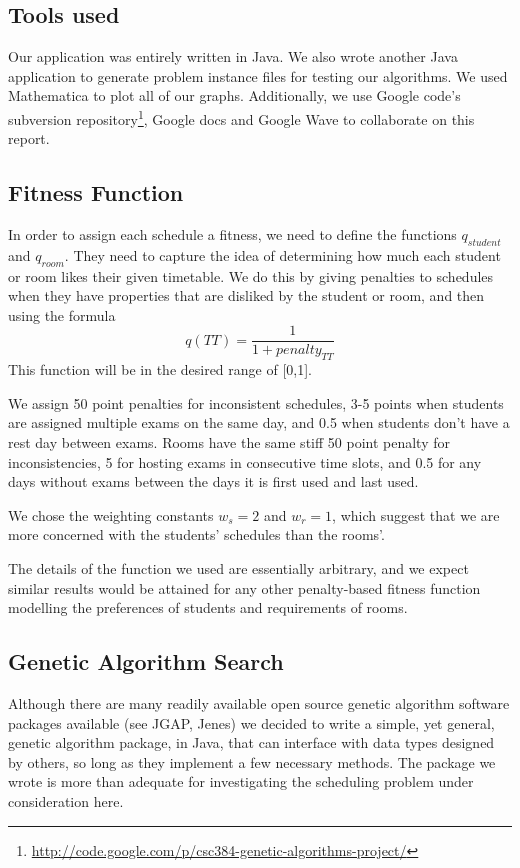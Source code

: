\documentclass[letterpaper]{article}
\begin{document}
  \subsection{Tools used}
    Our application was entirely written in Java. We also wrote another Java application 
    to generate problem instance files for testing our algorithms. We used Mathematica 
    to plot all of our graphs.  Additionally, we use Google code's subversion
    repository\footnote{\url{http://code.google.com/p/csc384-genetic-algorithms-project/}},
    Google docs and Google Wave to collaborate on this report.
    
  \subsection{Fitness Function}
    In order to assign each schedule a fitness, we need to define the functions
    $q_{student}$ and $q_{room}$. They need to capture the idea of determining 
    how much each student or room likes their given timetable. We do this by giving 
    penalties to schedules when they have properties that are disliked by the 
    student or room, and then using the formula
    \[ q(TT)=\frac{1}{1+penalty_{TT}} \]
    This function will be in the desired range of [0,1].
    
    We assign 50 point penalties for inconsistent schedules, 3-5 points when 
    students are assigned multiple exams on the same day, and 0.5 when students 
    don't have a rest day between exams. Rooms have the same stiff 50 point penalty 
    for inconsistencies, 5 for hosting exams in consecutive time slots, and 0.5 for 
    any days without exams between the days it is first used and last used.
    
    We chose the weighting constants $w_s=2$ and $w_r=1$, which suggest that we are 
    more concerned with the students' schedules than the rooms'.
    
    The details of the function we used are essentially arbitrary, and we expect 
    similar results would be attained for any other penalty-based fitness function 
    modelling the preferences of students and requirements of rooms.
    
  \subsection{Genetic Algorithm Search}
    Although there are many readily available open source genetic algorithm software 
    packages available (see JGAP, Jenes) we decided to write a simple, yet general, 
    genetic algorithm package, in Java, that can interface with data types designed 
    by others, so long as they implement a few necessary methods. The package we 
    wrote is more than adequate for investigating the scheduling problem under 
    consideration here.
    
\end{document}

